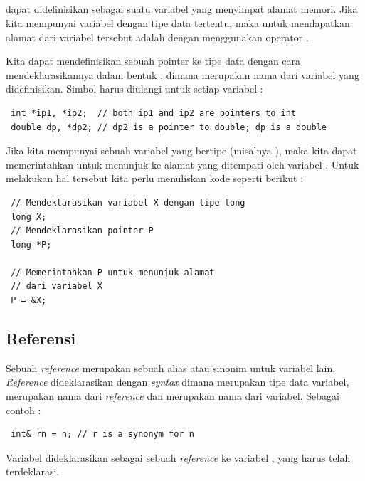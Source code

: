 \documentclass[../main.tex]{subfiles}
\begin{document}
    \subsection{\Pointer}
    {\Pointer} dapat didefinisikan sebagai suatu variabel yang menyimpat alamat memori. Jika kita mempunyai variabel dengan tipe data tertentu, maka untuk mendapatkan alamat dari variabel tersebut adalah dengan menggunakan operator  \parencite{raharjo2015pemrograman}.

    Kita dapat mendefinisikan sebuah pointer ke tipe data dengan cara mendeklarasikannya dalam bentuk , dimana  merupakan nama dari variabel yang didefinisikan. Simbol  harus diulangi untuk setiap variabel {\pointer} \parencite{Lippman_Lajoie_Moo_2013}:

\begin{lstlisting}
 int *ip1, *ip2;  // both ip1 and ip2 are pointers to int
 double dp, *dp2; // dp2 is a pointer to double; dp is a double
\end{lstlisting}

    Jika kita mempunyai sebuah variabel yang bertipe  (misalnya ), maka kita dapat memerintahkan {\pointer}  untuk menunjuk ke alamat yang ditempati oleh variabel . Untuk melakukan hal tersebut kita perlu menuliskan kode seperti berikut \parencite{raharjo2015pemrograman}:

\begin{lstlisting}
 // Mendeklarasikan variabel X dengan tipe long
 long X;
 // Mendeklarasikan pointer P
 long *P;

 // Memerintahkan P untuk menunjuk alamat
 // dari variabel X
 P = &X;
\end{lstlisting}

    \subsection{Referensi}

    Sebuah \textit{reference} merupakan sebuah alias atau sinonim untuk variabel lain. \textit{Reference} dideklarasikan dengan \textit{syntax}  dimana  merupakan tipe data variabel,  merupakan nama dari \textit{reference} dan  merupakan nama dari variabel. Sebagai contoh \parencite{hubbard2021programming} :

\begin{lstlisting}
 int& rn = n; // r is a synonym for n
\end{lstlisting}

    Variabel  dideklarasikan sebagai sebuah \textit{reference} ke variabel , yang harus telah terdeklarasi.
\end{document}
